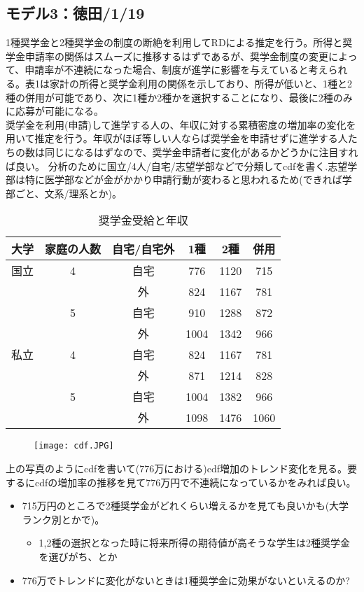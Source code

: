 \documentclass{jsarticle}
\begin{document}
\subsection{モデル3：徳田/1/19}
1種奨学金と2種奨学金の制度の断絶を利用してRDによる推定を行う。所得と奨学金申請率の関係はスムーズに推移するはずであるが、奨学金制度の変更によって、申請率が不連続になった場合、制度が進学に影響を与えていると考えられる。表1は家計の所得と奨学金利用の関係を示しており、所得が低いと、1種と2種の併用が可能であり、次に1種か2種かを選択することになり、最後に2種のみに応募が可能になる。\\

 奨学金を利用(申請)して進学する人の、年収に対する累積密度の増加率の変化を用いて推定を行う。年収がほぼ等しい人ならば奨学金を申請せずに進学する人たちの数は同じになるはずなので、奨学金申請者に変化があるかどうかに注目すれば良い。
 分析のために国立/4人/自宅/志望学部などで分類してcdfを書く.志望学部は特に医学部などが金がかかり申請行動が変わると思われるため(できれば学部ごと、文系/理系とか)。\\

\begin{table}[htb]
\begin{center}
\caption{奨学金受給と年収}
  \begin{tabular}{cccccc} \hline
   大学 & 家庭の人数 & 自宅/自宅外 & 1種    &2種      &併用 \\ \hline \hline
   国立 &      4            &自宅           & 776   & 1120   &715 \\
           &                    & 外          & 824   &1167    &781\\
           &      5            & 自宅          & 910   & 1288   &872 \\ 
           &                    & 外          & 1004 & 1342   & 966 \\  \hline
   私立 &      4            &自宅           & 824   & 1167   &781 \\
           &                    & 外          & 871   &1214    &828\\
           &      5            & 自宅          & 1004 & 1382   &966\\ 
           &                    & 外         & 1098 & 1476   &1060\\  \hline  
           \end{tabular}   
   \end{center}
\end{table}

\begin{figure}[htbp]
\begin{center}
  \texttt{[image: cdf.JPG]}
  \end{center}
\end{figure}

上の写真のようにcdfを書いて(776万における)cdf増加のトレンド変化を見る。要するにcdfの増加率の推移を見て776万円で不連続になっているかをみれば良い。
\begin{itemize}
\item 715万円のところで2種奨学金がどれくらい増えるかを見ても良いかも(大学ランク別とかで)。
\begin{itemize}
\item 1,2種の選択となった時に将来所得の期待値が高そうな学生は2種奨学金を選びがち、とか
\end{itemize}
\item 776万でトレンドに変化がないときは1種奨学金に効果がないといえるのか?
\end{itemize}
\end{document}
